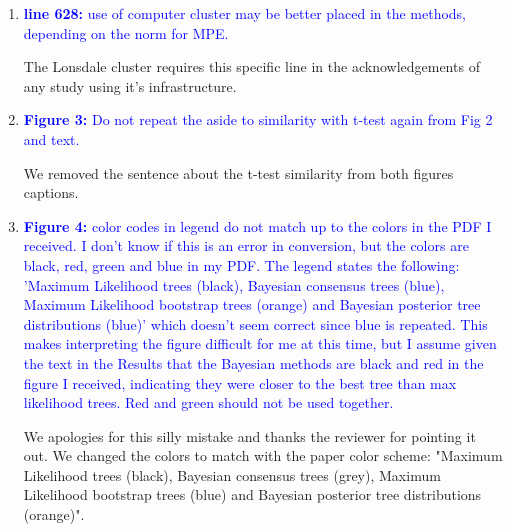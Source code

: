 \documentclass[12pt,letterpaper]{article}
\begin{document}
\begin{enumerate}

\item{\textcolor{blue}{\textbf{line 628:} use of computer cluster may be better placed in the methods, depending on the norm for MPE.}}

The Lonsdale cluster requires this specific line in the acknowledgements of any study using it's infrastructure.

\item{\textcolor{blue}{\textbf{Figure 3:} Do not repeat the aside to similarity with t-test again from Fig 2 and text.}}

We removed the sentence about the t-test similarity from both figures captions. %

\item{\textcolor{blue}{\textbf{Figure 4:} color codes in legend do not match up to the colors in the PDF I received. I don't know if this is an error in conversion, but the colors are black, red, green and blue in my PDF. The legend states the following: 'Maximum Likelihood trees (black), Bayesian consensus trees (blue), Maximum Likelihood bootstrap trees (orange) and Bayesian posterior tree distributions (blue)' which doesn't seem correct since blue is repeated. This makes interpreting the figure difficult for me at this time, but I assume given the text in the Results that the Bayesian methods are black and red in the figure I received, indicating they were closer to the best tree than max likelihood trees. Red and green should not be used together.}}

We apologies for this silly mistake and thanks the reviewer for pointing it out. We changed the colors to match with the paper color scheme: "Maximum Likelihood trees (black), Bayesian consensus trees (grey), Maximum Likelihood bootstrap trees (blue) and Bayesian posterior tree distributions (orange)".


\end{enumerate}
\end{document}
